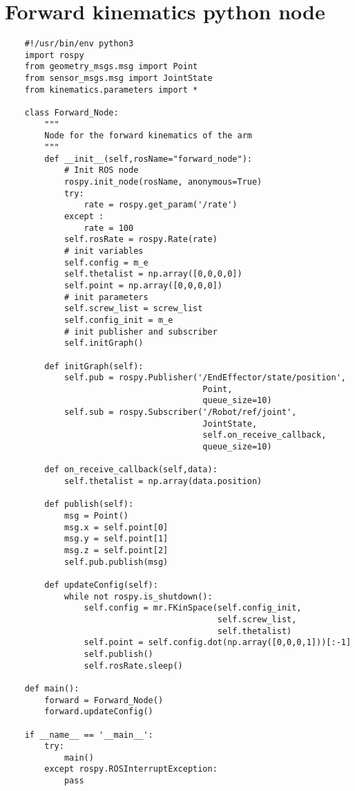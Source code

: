 \section{Forward kinematics python node}

\begin{verbatim}
    #!/usr/bin/env python3
    import rospy
    from geometry_msgs.msg import Point
    from sensor_msgs.msg import JointState
    from kinematics.parameters import *
    
    class Forward_Node:
        """
        Node for the forward kinematics of the arm
        """
        def __init__(self,rosName="forward_node"):
            # Init ROS node
            rospy.init_node(rosName, anonymous=True)
            try:
                rate = rospy.get_param('/rate')
            except :
                rate = 100
            self.rosRate = rospy.Rate(rate)
            # init variables
            self.config = m_e
            self.thetalist = np.array([0,0,0,0])
            self.point = np.array([0,0,0,0])
            # init parameters 
            self.screw_list = screw_list
            self.config_init = m_e
            # init publisher and subscriber
            self.initGraph()
    
        def initGraph(self):
            self.pub = rospy.Publisher('/EndEffector/state/position',
                                        Point,
                                        queue_size=10)
            self.sub = rospy.Subscriber('/Robot/ref/joint',
                                        JointState,
                                        self.on_receive_callback,
                                        queue_size=10)
    
        def on_receive_callback(self,data):
            self.thetalist = np.array(data.position)
            
        def publish(self):
            msg = Point()
            msg.x = self.point[0]
            msg.y = self.point[1]
            msg.z = self.point[2]
            self.pub.publish(msg)
    
        def updateConfig(self):
            while not rospy.is_shutdown():
                self.config = mr.FKinSpace(self.config_init,
                                           self.screw_list,
                                           self.thetalist)
                self.point = self.config.dot(np.array([0,0,0,1]))[:-1]
                self.publish()
                self.rosRate.sleep()
    
    def main():
        forward = Forward_Node()
        forward.updateConfig()
    
    if __name__ == '__main__':
        try:
            main()
        except rospy.ROSInterruptException:
            pass
\end{verbatim}